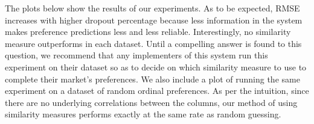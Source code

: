 The plots below show the results of our experiments. As to be expected, RMSE increases with higher dropout percentage because less information in the system makes preference predictions less and less reliable. Interestingly, no similarity measure outperforms in each dataset. Until a compelling answer is found to this question, we recommend that any implementers of this system run this experiment on their dataset so as to decide on which similarity measure to use to complete their market's preferences. We also include a plot of running the same experiment on a dataset of random ordinal preferences. As per the intuition, since there are no underlying correlations between the columns, our method of using similarity measures performs exactly at the same rate as random guessing.